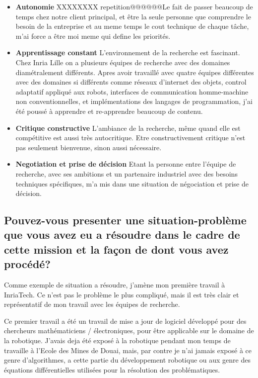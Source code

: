 \documentclass{resume} %
\begin{document}
			\begin{itemize} 				
			\item \textbf{Autonomie} \newline
				XXXXXXXX repetition@@@@@@Le fait de passer beaucoup de temps chez notre client principal, et être la seule personne que comprendre le besoin de la entreprise et au meme temps le cout technique de chaque tâche, m'ai force a être moi meme qui define les priorités. 
			\item \textbf{Apprentissage constant } \newline
				L'environnement de la recherche est fascinant. Chez Inria Lille on a plusieurs équipes de recherche avec des domaines diamétralement différents. Apres avoir travaillé avec quatre équipes différentes avec des domaines si différents comme réseaux d'internet des objets, control adaptatif appliqué aux robots,  interfaces de communication homme-machine non conventionnelles, et implémentations des langages de programmation, j'ai été poussé à apprendre et re-apprendre beaucoup de contenu. 
			\item \textbf{Critique constructive} \newline
				L'ambiance de la recherche, même quand elle est compétitive est aussi très autocritique. Etre constructivement critique n'est pas seulement bienvenue, sinon aussi nécessaire.
			\item \textbf{Negotiation et prise de décision } \newline
		Etant la personne entre l'équipe de recherche, avec ses ambitions et un partenaire industriel avec des besoins techniques spécifiques, m'a mis dans une situation de négociation  et prise de décision. 
		\end{itemize}

		
	\subsection{Pouvez-vous presenter une situation-problème que vous avez eu a résoudre dans le cadre de cette mission et la façon de dont vous avez procédé?}
	
		Comme exemple de situation a résoudre, j'amène mon première travail à InriaTech. Ce n'est pas le problème le plus compliqué, mais il est très clair et représentatif de mon travail avec les équipes de recherche.  
		
		 Ce premier travail a été un travail de mise a jour de logiciel développé pour des chercheurs mathématiciens / électroniques, pour être applicable sur le domaine de la robotique. 
		J'avais deja été exposé à la robotique pendant mon temps de travaille à l'Ecole des Mines de Douai, mais, par contre je n'ai jamais exposé à ce genre d'algorithmes, a cette partie du développement robotique ou aux genre des équations différentielles utilisées pour la résolution des problématiques. 
		
\end{document}

